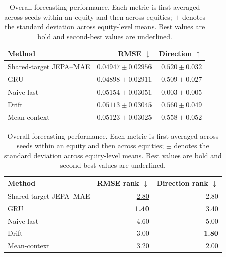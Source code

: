 \begin{table}[t]
\centering
\small
\caption{Overall forecasting performance. Each metric is first averaged across seeds within an equity and then across equities; $\pm$ denotes the standard deviation across equity-level means. Best values are bold and second-best values are underlined.}
\label{tab:main_metrics}
\begin{tabular}{lrr}
\toprule
Method & RMSE $\downarrow$ & Direction $\uparrow$ \\
\midrule
Shared-target JEPA--MAE & \underline{$0.04947 \pm 0.02956$} & $0.520 \pm 0.032$ \\
GRU & \textbf{$0.04898 \pm 0.02911$} & $0.509 \pm 0.027$ \\
Naive-last & $0.05154 \pm 0.03051$ & $0.003 \pm 0.005$ \\
Drift & $0.05113 \pm 0.03045$ & \textbf{$0.560 \pm 0.049$} \\
Mean-context & $0.05123 \pm 0.03025$ & \underline{$0.558 \pm 0.052$} \\
\bottomrule
\end{tabular}
\par\medskip
\begin{tabular}{lrr}
\toprule
Method & RMSE rank $\downarrow$ & Direction rank $\downarrow$ \\
\midrule
Shared-target JEPA--MAE & \underline{2.80} & 2.80 \\
GRU & \textbf{1.40} & 3.40 \\
Naive-last & 4.60 & 5.00 \\
Drift & 3.00 & \textbf{1.80} \\
Mean-context & 3.20 & \underline{2.00} \\
\bottomrule
\end{tabular}
\end{table}
